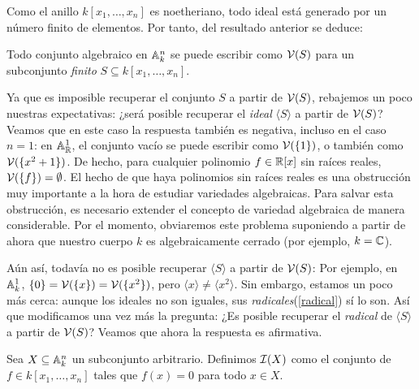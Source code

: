 \documentclass[ACGA.tex]{subfiles}
\begin{document}
Como el anillo $k[x_1,\ldots,x_n]$ es noetheriano, todo ideal está generado por un número finito de elementos. Por tanto, del resultado anterior se deduce:

\begin{coro}
 Todo conjunto algebraico en $\mathbb{A}^n_k$ se puede escribir como $\mathcal{V}(S)$ para un subconjunto \emph{finito} $S\subseteq k[x_1,\ldots,x_n]$.
\end{coro}

Ya que es imposible recuperar el conjunto $S$ a partir de $\mathcal{V}(S)$, rebajemos un poco nuestras expectativas: ¿será posible recuperar el \emph{ideal} $\langle S\rangle$ a partir de $\mathcal{V}(S)$? Veamos que en este caso la respuesta también es negativa, incluso en el caso $n=1$: en $\mathbb{A}^1_{\mathbb{R}}$, el conjunto vacío se puede escribir como $\mathcal{V}(\{1\})$, o también como $\mathcal{V}(\{x^2+1\})$. De hecho, para cualquier polinomio $f\in \mathbb{R}[x]$ sin raíces reales, $\mathcal{V}(\{f\})=\emptyset$. El hecho de que haya polinomios sin raíces reales es una obstrucción muy importante a la hora de estudiar variedades algebraicas. Para salvar esta obstrucción, es necesario extender el concepto de variedad algebraica de manera considerable. Por el momento, obviaremos este problema suponiendo a partir de ahora que nuestro cuerpo $k$ es algebraicamente cerrado (por ejemplo, $k=\mathbb{C}$).

Aún así, todavía no es posible recuperar $\langle S\rangle$ a partir de $\mathcal{V}(S)$: Por ejemplo, en $\mathbb{A}^1_k$, $\{0\}=\mathcal{V}(\{x\})=\mathcal{V}(\{x^2\})$, pero $\langle x\rangle\neq\langle x^2\rangle$. Sin embargo, estamos un poco más cerca: aunque los ideales no son iguales, sus \emph{radicales}(\ref{radical}) sí lo son. Así que modificamos una vez más la pregunta: ¿Es posible recuperar el \emph{radical} de $\langle S\rangle$ a partir de $\mathcal{V}(S)$? Veamos que ahora la respuesta es afirmativa.

Sea $X\subseteq \mathbb{A}^n_k$ un subconjunto arbitrario. Definimos $\mathcal{I}(X)$ como el conjunto de $f\in k[x_1,\ldots,x_n]$ tales que $f(x)=0$ para todo $x\in X$. 
\end{document}

